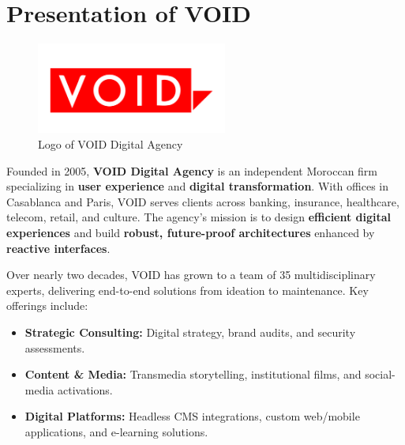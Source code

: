 \section{Presentation of VOID}
\begin{figure}[ht]
        \centering
        \includegraphics[height=3cm]{images/logo-void.png}
        \caption{Logo of VOID Digital Agency}
        \label{fig:void-logo}
      \end{figure}
      \clearpage
\noindent
Founded in 2005, \textbf{VOID Digital Agency} is an independent Moroccan firm specializing in \textbf{user experience} and \textbf{digital transformation}. With offices in Casablanca and Paris, VOID serves clients across banking, insurance, healthcare, telecom, retail, and culture. The agency's mission is to design \textbf{efficient digital experiences} and build \textbf{robust, future-proof architectures} enhanced by \textbf{reactive interfaces}.

\medskip

\noindent
Over nearly two decades, VOID has grown to a team of 35 multidisciplinary experts, delivering end-to-end solutions from ideation to maintenance. Key offerings include:

\begin{itemize}
  \item \textbf{Strategic Consulting:} Digital strategy, brand audits, and security assessments.  
  \item \textbf{Content \& Media:} Transmedia storytelling, institutional films, and social-media activations.
  \item \textbf{Digital Platforms:} Headless CMS integrations, custom web/mobile applications, and e-learning solutions.
\end{itemize}

